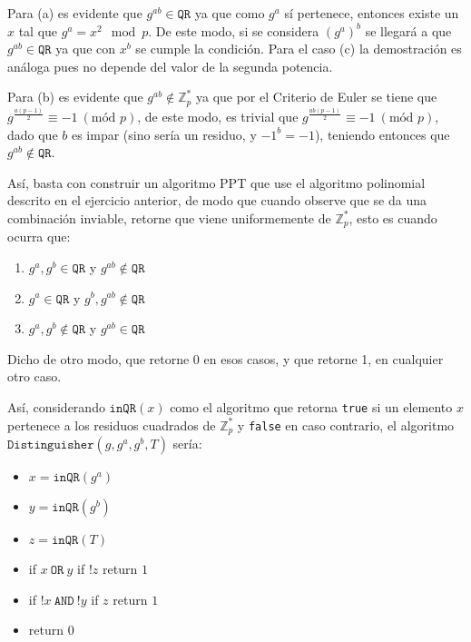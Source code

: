 \documentclass[twoside]{tareas}
\begin{document}
\begin{enumerate}
    Para (a) es evidente que $g^{ab} \in \texttt{QR}$ ya que como $g^a$ sí pertenece, entonces existe un $x$ tal que $g^a = x^2\mod p$. De este modo, si se considera $(g^a)^b$ se llegará a que $g^{ab} \in \texttt{QR}$ ya que con $x^b$ se cumple la condición. Para el caso (c) la demostración es análoga pues no depende del valor de la segunda potencia.

    Para (b) es evidente que $g^{ab} \notin \mathbb{Z}_p^*$ ya que por el Criterio de Euler se tiene que $g^\frac{a(p-1)}{2} \equiv -1 \ ( \text{mód } p) $, de este modo, es trivial que $g^\frac{ab(p-1)}{2} \equiv -1 \ ( \text{mód } p) $, dado que $b$ es impar (sino sería un residuo, y $-1^b = -1$), teniendo entonces que $g^{ab} \notin \texttt{QR}$.

    Así, basta con construir un algoritmo PPT que use el algoritmo polinomial descrito en el ejercicio anterior, de modo que cuando observe que se da una combinación inviable, retorne que viene uniformemente de $\mathbb{Z}_p^*$, esto es cuando ocurra que:
    \begin{enumerate}
        \item $g^a, g^b \in \texttt{QR}$ y $g^{ab} \notin \texttt{QR}$
        \item $g^a \in \texttt{QR}$ y $g^b, g^{ab} \notin \texttt{QR}$
        \item $g^a, g^b \notin \texttt{QR}$ y $g^{ab} \in \texttt{QR}$
    \end{enumerate}
    Dicho de otro modo, que retorne 0 en esos casos, y que retorne 1, en cualquier otro caso.

    Así, considerando $\texttt{inQR}(x)$ como el algoritmo que retorna \texttt{true} si un elemento $x$ pertenece a los residuos cuadrados de $\mathbb{Z}_p^*$ y \texttt{false} en caso contrario, el algoritmo $\texttt{Distinguisher}(g, g^a, g^b, T)$ sería:

    \begin{itemize}
        \item $x = \texttt{inQR}(g^a)$
        \item $y = \texttt{inQR}(g^b)$
        \item $z = \texttt{inQR}(T)$
        \item if $x \ \texttt{OR} \ y$
            \subitem if $!z$ return $1$
        \item if $!x \ \texttt{AND} \ !y$
            \subitem if $z$ return $1$
        \item return $0$
    \end{itemize}


\end{enumerate}
\end{document}
